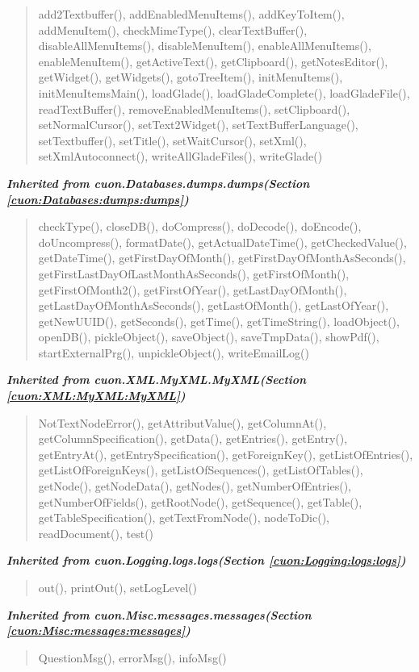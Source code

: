 \begin{quote}
add2Textbuffer(), addEnabledMenuItems(), addKeyToItem(), addMenuItem(), checkMimeType(), clearTextBuffer(), disableAllMenuItems(), disableMenuItem(), enableAllMenuItems(), enableMenuItem(), getActiveText(), getClipboard(), getNotesEditor(), getWidget(), getWidgets(), gotoTreeItem(), initMenuItems(), initMenuItemsMain(), loadGlade(), loadGladeComplete(), loadGladeFile(), readTextBuffer(), removeEnabledMenuItems(), setClipboard(), setNormalCursor(), setText2Widget(), setTextBufferLanguage(), setTextbuffer(), setTitle(), setWaitCursor(), setXml(), setXmlAutoconnect(), writeAllGladeFiles(), writeGlade()
\end{quote}

\large{\textbf{\textit{Inherited from cuon.Databases.dumps.dumps\textit{(Section \ref{cuon:Databases:dumps:dumps})}}}}

\begin{quote}
checkType(), closeDB(), doCompress(), doDecode(), doEncode(), doUncompress(), formatDate(), getActualDateTime(), getCheckedValue(), getDateTime(), getFirstDayOfMonth(), getFirstDayOfMonthAsSeconds(), getFirstLastDayOfLastMonthAsSeconds(), getFirstOfMonth(), getFirstOfMonth2(), getFirstOfYear(), getLastDayOfMonth(), getLastDayOfMonthAsSeconds(), getLastOfMonth(), getLastOfYear(), getNewUUID(), getSeconds(), getTime(), getTimeString(), loadObject(), openDB(), pickleObject(), saveObject(), saveTmpData(), showPdf(), startExternalPrg(), unpickleObject(), writeEmailLog()
\end{quote}

\large{\textbf{\textit{Inherited from cuon.XML.MyXML.MyXML\textit{(Section \ref{cuon:XML:MyXML:MyXML})}}}}

\begin{quote}
NotTextNodeError(), getAttributValue(), getColumnAt(), getColumnSpecification(), getData(), getEntries(), getEntry(), getEntryAt(), getEntrySpecification(), getForeignKey(), getListOfEntries(), getListOfForeignKeys(), getListOfSequences(), getListOfTables(), getNode(), getNodeData(), getNodes(), getNumberOfEntries(), getNumberOfFields(), getRootNode(), getSequence(), getTable(), getTableSpecification(), getTextFromNode(), nodeToDic(), readDocument(), test()
\end{quote}

\large{\textbf{\textit{Inherited from cuon.Logging.logs.logs\textit{(Section \ref{cuon:Logging:logs:logs})}}}}

\begin{quote}
out(), printOut(), setLogLevel()
\end{quote}

\large{\textbf{\textit{Inherited from cuon.Misc.messages.messages\textit{(Section \ref{cuon:Misc:messages:messages})}}}}

\begin{quote}
QuestionMsg(), errorMsg(), infoMsg()
\end{quote}
